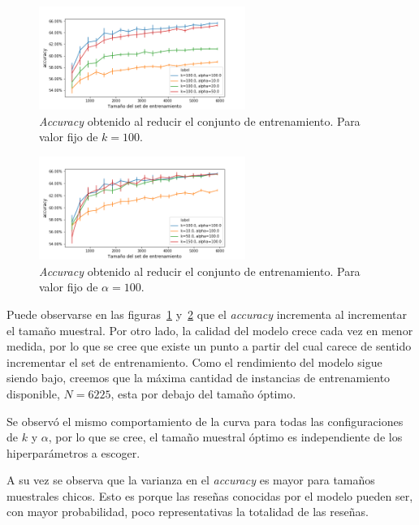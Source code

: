 \begin{figure}[ht]
    \centering
    \includegraphics[width=0.6\textwidth]{img/exp_subsampling_k_fijo}
    \caption{\textit{Accuracy} obtenido al reducir el conjunto de
    entrenamiento.  Para valor fijo de $k=100$.}%
    \label{fig:subsampling_k_fijo}
\end{figure}

\begin{figure}[ht]
    \centering
    \includegraphics[width=0.6\textwidth]{img/exp_subsampling_alpha_fijo}
    \caption{\textit{Accuracy} obtenido al reducir el conjunto de
    entrenamiento.  Para valor fijo de $\alpha=100$.}%
    \label{fig:subsampling_alpha_fijo}
\end{figure}

%
Puede observarse en las figuras~\ref{fig:subsampling_k_fijo}
y~\ref{fig:subsampling_alpha_fijo} que el \textit{accuracy} incrementa al
incrementar el tamaño muestral.  Por otro lado, la calidad del modelo crece
cada vez en menor medida, por lo que se cree que existe un punto a partir del
cual carece de sentido incrementar el set de entrenamiento. Como el rendimiento
del modelo sigue siendo bajo, creemos que la máxima cantidad de instancias de
entrenamiento disponible, $N = 6225$, esta por debajo del tamaño óptimo.

%
Se observó el mismo comportamiento de la curva para todas las configuraciones
de $k$ y $\alpha$, por lo que se cree, el tamaño muestral óptimo es
independiente de los hiperparámetros a escoger.

%
A su vez se observa que la varianza en el \textit{accuracy} es mayor para
tamaños muestrales chicos. Esto es porque las reseñas conocidas por el modelo
pueden ser, con mayor probabilidad, poco representativas la totalidad de las
reseñas.

